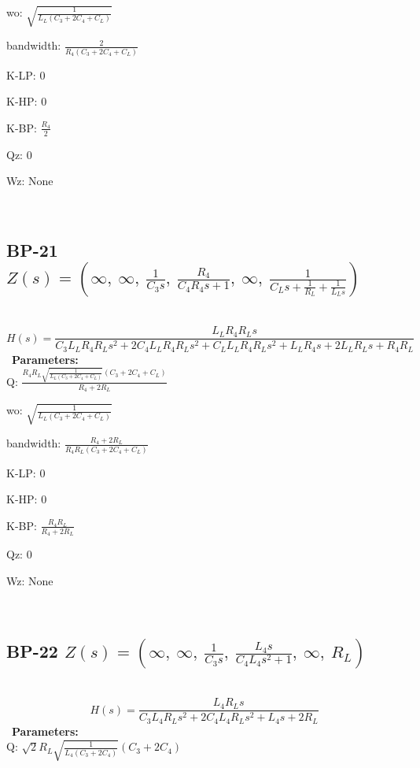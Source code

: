 \documentclass{article}
\begin{document}
wo: $\sqrt{\frac{1}{L_{L} \left(C_{3} + 2 C_{4} + C_{L}\right)}}$\ 

bandwidth: $\frac{2}{R_{4} \left(C_{3} + 2 C_{4} + C_{L}\right)}$\ 

K-LP: $0$\ 

K-HP: $0$\ 

K-BP: $\frac{R_{4}}{2}$\ 

Qz: $0$\ 

Wz: $\text{None}$\ 

\ 

\subsection{BP-21 $Z(s) = \left( \infty, \  \infty, \  \frac{1}{C_{3} s}, \  \frac{R_{4}}{C_{4} R_{4} s + 1}, \  \infty, \  \frac{1}{C_{L} s + \frac{1}{R_{L}} + \frac{1}{L_{L} s}}\right)$ } \ 
\textbf{\[H(s) = \frac{L_{L} R_{4} R_{L} s}{C_{3} L_{L} R_{4} R_{L} s^{2} + 2 C_{4} L_{L} R_{4} R_{L} s^{2} + C_{L} L_{L} R_{4} R_{L} s^{2} + L_{L} R_{4} s + 2 L_{L} R_{L} s + R_{4} R_{L}}\] } \ 
\textbf{Parameters:}\\ 

Q: $\frac{R_{4} R_{L} \sqrt{\frac{1}{L_{L} \left(C_{3} + 2 C_{4} + C_{L}\right)}} \left(C_{3} + 2 C_{4} + C_{L}\right)}{R_{4} + 2 R_{L}}$\ 

wo: $\sqrt{\frac{1}{L_{L} \left(C_{3} + 2 C_{4} + C_{L}\right)}}$\ 

bandwidth: $\frac{R_{4} + 2 R_{L}}{R_{4} R_{L} \left(C_{3} + 2 C_{4} + C_{L}\right)}$\ 

K-LP: $0$\ 

K-HP: $0$\ 

K-BP: $\frac{R_{4} R_{L}}{R_{4} + 2 R_{L}}$\ 

Qz: $0$\ 

Wz: $\text{None}$\ 

\ 

\subsection{BP-22 $Z(s) = \left( \infty, \  \infty, \  \frac{1}{C_{3} s}, \  \frac{L_{4} s}{C_{4} L_{4} s^{2} + 1}, \  \infty, \  R_{L}\right)$ } \ 
\textbf{\[H(s) = \frac{L_{4} R_{L} s}{C_{3} L_{4} R_{L} s^{2} + 2 C_{4} L_{4} R_{L} s^{2} + L_{4} s + 2 R_{L}}\] } \ 
\textbf{Parameters:}\\ 

Q: $\sqrt{2} R_{L} \sqrt{\frac{1}{L_{4} \left(C_{3} + 2 C_{4}\right)}} \left(C_{3} + 2 C_{4}\right)$\ 
\end{document}
